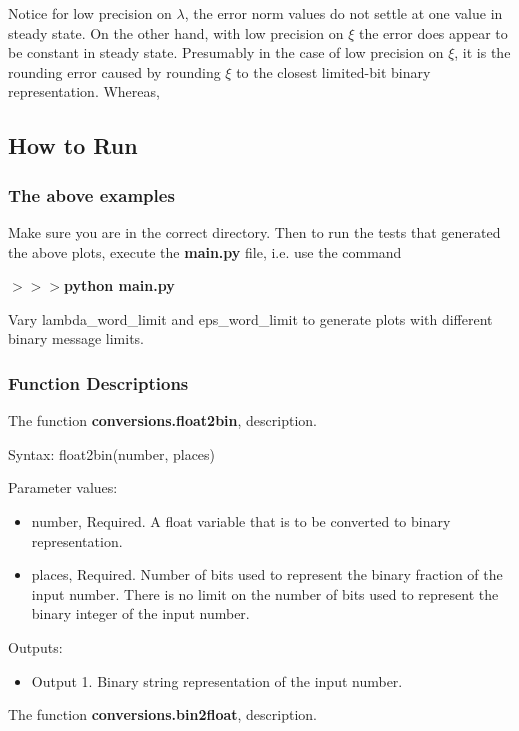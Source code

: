\documentclass[12pt]{article}
\begin{document}
Notice for low precision on $\lambda$, the error norm values do not settle at one value in steady state. On the other hand, with low precision on $\xi$ the error does appear to be constant in steady state. Presumably in the case of low precision on $\xi$, it is the rounding error caused by rounding $\xi$ to the closest limited-bit binary representation. Whereas, 

\subsection*{How to Run}

\subsubsection*{The above examples}

Make sure you are in the correct directory. Then to run the tests that generated the above plots, execute the \textbf{main.py} file, i.e. use the command

\noindent \textbf{$>>>$python main.py}

Vary lambda\_word\_limit and eps\_word\_limit to generate plots with different binary message limits.

\subsubsection*{Function Descriptions}

The function \textbf{conversions.float2bin}, description.

Syntax: float2bin(number, places)

Parameter values:
\begin{itemize}
	\item number, Required. A float variable that is to be converted to binary representation.
	\item places, Required. Number of bits used to represent the binary fraction of the input number. There is no limit on the number of bits used to represent the binary integer of the input number.
\end{itemize}

Outputs:
\begin{itemize}
	\item Output 1. Binary string representation of the input number. 
\end{itemize}

\noindent The function \textbf{conversions.bin2float}, description.
\end{document}
